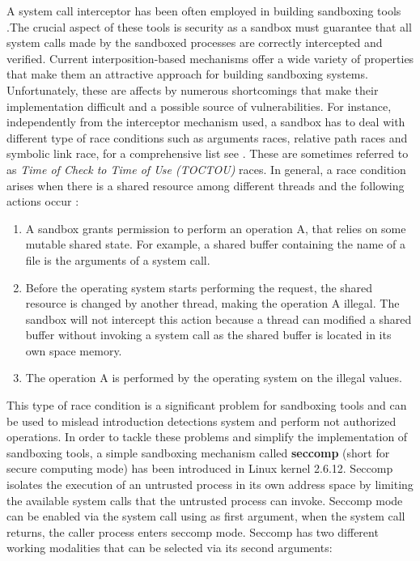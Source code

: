 A system call interceptor has been often employed in building sandboxing tools \cite{Janus, Garfinkel03ostia:a,MapBox, others}.The crucial aspect of these tools is security as a sandbox must guarantee that all system calls made by the sandboxed processes are correctly intercepted and verified. Current interposition-based mechanisms offer a wide variety of properties that make them an attractive approach for building sandboxing systems. Unfortunately, these are affects by numerous shortcomings that make their implementation difficult and a possible source of vulnerabilities. For instance, independently from the interceptor mechanism used, a sandbox has to deal with different type of race conditions such as arguments races, relative path races and symbolic link race, for a comprehensive list see \cite{garfinkel:traps, Watson_exploitingconcurrency}. These are sometimes referred to as \textit{Time of Check to Time of Use (TOCTOU)} races. In general, a race condition arises when there is a shared resource among different threads and the following actions occur : 
\begin{enumerate}

\item A sandbox grants permission to perform an operation A, that relies on some mutable shared state. For example, a shared buffer containing the name of a file is the arguments of a system call. 

\item Before the operating system starts performing the request, the shared resource is changed by another thread, making the operation A illegal. The sandbox will not intercept this action because a thread can modified a shared buffer without invoking a system call as the shared buffer is located in its own space memory. 

\item The operation A is performed by the operating system on the illegal values. 
\end{enumerate}  

This type of race condition is a significant problem for sandboxing tools and can be used to mislead introduction detections system and perform not authorized operations. In order to tackle these problems and simplify the implementation of sandboxing tools, a simple sandboxing mechanism called \textbf{seccomp} (short for secure computing mode)  has been introduced in Linux kernel 2.6.12. Seccomp isolates the execution of an untrusted process in its own address space by limiting the available system calls that the untrusted process can invoke. Seccomp mode can be enabled via the  \cite{prctl}  system call using   as first argument, when the system call returns,  the caller process enters seccomp mode. Seccomp has two different working modalities that can be selected via its second arguments:  

